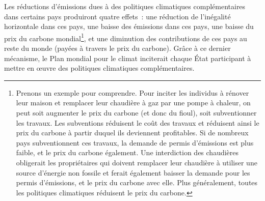 \documentclass[a5paper,french,openany]{memoir}
\begin{document}
Les réductions d'émissions dues à des politiques climatiques complémentaires dans certains pays 
produiront quatre effets~: une réduction de l'inégalité horizontale dans ces pays, une baisse des émissions dans ces pays, une baisse du prix du carbone mondial\footnote{Prenons un exemple pour comprendre. 
Pour inciter les individus à rénover leur maison et remplacer leur chaudière à gaz par une pompe à chaleur, on peut soit augmenter le prix du carbone (et donc du fioul), soit subventionner les travaux. 
Les subventions réduisent le coût des travaux et réduisent ainsi le prix du carbone à partir duquel ils deviennent profitables. 
Si de nombreux pays subventionnent ces travaux, %
la demande de permis d'émissions est plus faible, et le prix du carbone également. 
Une interdiction des chaudières obligerait les propriétaires qui doivent remplacer leur chaudière à utiliser une source d'énergie non fossile et ferait également baisser la demande pour les permis d'émissions, et le prix du carbone avec elle. Plus généralement, toutes les politiques climatiques réduisent le prix du carbone.}, 
et une diminution des contributions de ces pays au reste du monde (payées à travers le prix du carbone). Grâce à ce dernier mécanisme, le Plan mondial pour le climat inciterait chaque État participant à mettre en œuvre des politiques climatiques complémentaires. 
\end{document}
